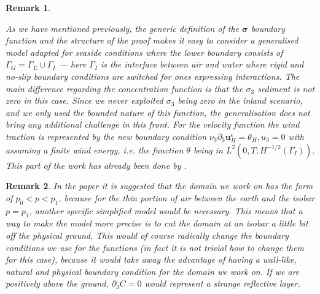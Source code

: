 \documentclass[11pt]{article}
\newtheorem{remark}{Remark}
\begin{document}
\begin{remark}
\normalfont

\begin{figure}[!h]
\centering
{}
\end{figure}

As we have mentioned previously, the generic definition of the $\boldsymbol{\sigma}$ boundary function and the structure of the proof makes it easy to consider a generalised model adapted for seaside conditions where the lower boundary consists of $\Gamma_G = \Gamma_E \cup \Gamma_I$ --- here $\Gamma_I$ is the interface between air and water where rigid and no-slip boundary conditions are switched for ones expressing interactions. The main difference regarding the concentration function is that the $\sigma_3$ sediment is not zero in this case. Since we never exploited $\sigma_3$ being zero in the inland scenario, and we only used the bounded nature of this function, the generalisation does not bring any additional challenge in this front. For the velocity function the wind traction is represented by the new boundary condition $\nu_3 \partial_3 \mathbf{u}^\epsilon_H = \theta_H, u_3 = 0$ with assuming a finite wind energy, i.e. the function $\theta$ being in $L^2(0,T; H^{-1/2}(\Gamma_I))$. This part of the work has already been done by \cite{azerad2001mathematical}.
\end{remark}

\begin{remark}
\normalfont In the paper \cite{temam2005some} it is suggested that the domain we work on has the form of $p_0 < p < p_1$, because for the thin portion of air between the earth and the isobar $p = p_1$, another specific simplified model would be necessary. This means that a way to make the model more precise is to cut the domain at an isobar a little bit off the physical ground. This would of course radically change the boundary conditions we use for the functions (in fact it is not trivial how to change them for this case), because it would take away the advantage of having a wall-like, natural and physical boundary condition for the domain we work on. If we are positively above the ground, $\partial_3 C = 0$ would represent a strange reflective layer.
\end{remark}
\end{document}
